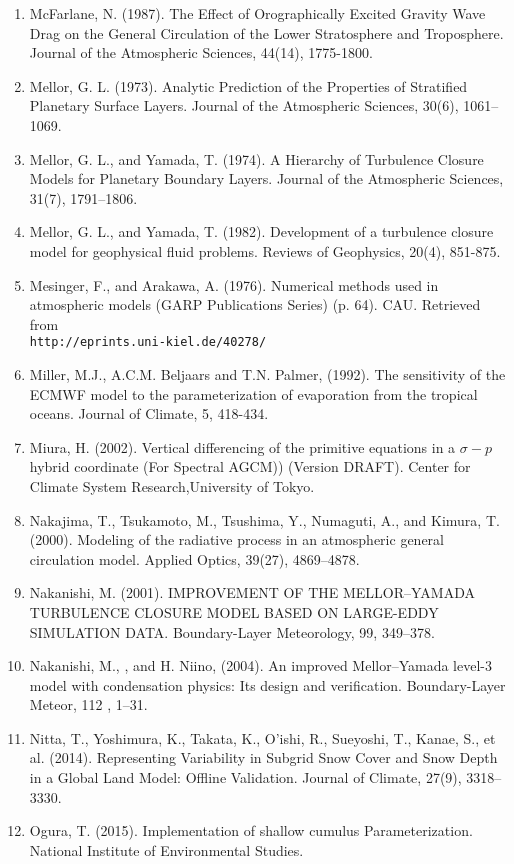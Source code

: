 \begin{enumerate}
\item McFarlane, N. (1987). The Effect of Orographically Excited Gravity Wave Drag on the General Circulation of the Lower Stratosphere and Troposphere. Journal of the Atmospheric Sciences, 44(14), 1775-1800.
\item Mellor, G. L. (1973). Analytic Prediction of the Properties of Stratified Planetary Surface Layers. Journal of the Atmospheric Sciences, 30(6), 1061–1069.
\item Mellor, G. L., and Yamada, T. (1974). A Hierarchy of Turbulence Closure Models for Planetary Boundary Layers. Journal of the Atmospheric Sciences, 31(7), 1791–1806.
\item Mellor, G. L., and Yamada, T. (1982). Development of a turbulence closure model for geophysical fluid problems. Reviews of Geophysics, 20(4), 851-875.
\item Mesinger, F., and Arakawa, A. (1976). Numerical methods used in atmospheric models (GARP Publications Series) (p. 64). CAU. Retrieved from \\
\texttt{http://eprints.uni-kiel.de/40278/}
\item Miller, M.J., A.C.M. Beljaars and T.N. Palmer, (1992). The sensitivity of the ECMWF model to the parameterization of evaporation from the tropical oceans. Journal of Climate, 5, 418-434.
\item Miura, H. (2002). Vertical differencing of the primitive equations in a $\sigma - p$ hybrid coordinate (For Spectral AGCM)) (Version DRAFT). Center for Climate System Research,University of Tokyo.
\item Nakajima, T., Tsukamoto, M., Tsushima, Y., Numaguti, A., and Kimura, T. (2000). Modeling of the radiative process in an atmospheric general circulation model. Applied Optics, 39(27), 4869–4878.
\item Nakanishi, M. (2001). IMPROVEMENT OF THE MELLOR–YAMADA TURBULENCE CLOSURE MODEL BASED ON LARGE-EDDY SIMULATION DATA. Boundary-Layer Meteorology, 99, 349–378.
\item Nakanishi, M., , and H. Niino, (2004). An improved Mellor–Yamada level-3 model with condensation physics: Its design and verification. Boundary-Layer Meteor, 112 , 1–31.
\item Nitta, T., Yoshimura, K., Takata, K., O’ishi, R., Sueyoshi, T., Kanae, S., et al. (2014). Representing Variability in Subgrid Snow Cover and Snow Depth in a Global Land Model: Offline Validation. Journal of Climate, 27(9), 3318–3330.
\item Ogura, T. (2015). Implementation of shallow cumulus Parameterization. National Institute of Environmental Studies.

\end{enumerate}
